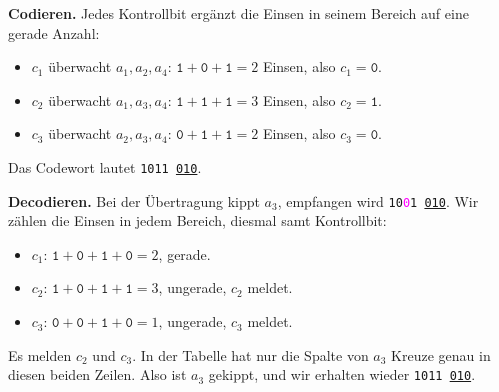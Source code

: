 \begin{myexample}
    \textbf{Codieren.} Jedes Kontrollbit ergänzt die Einsen in seinem
    Bereich auf eine gerade Anzahl:
    \begin{itemize}
        \item \textcolor{ueA}{\(c_1\)} überwacht \(a_1,a_2,a_4\):
              \(\texttt{1}+\texttt{0}+\texttt{1}=2\) Einsen, also \(c_1=\texttt{0}\).
        \item \textcolor{ueB}{\(c_2\)} überwacht \(a_1,a_3,a_4\):
              \(\texttt{1}+\texttt{1}+\texttt{1}=3\) Einsen, also \(c_2=\texttt{1}\).
        \item \textcolor{ueC}{\(c_3\)} überwacht \(a_2,a_3,a_4\):
              \(\texttt{0}+\texttt{1}+\texttt{1}=2\) Einsen, also \(c_3=\texttt{0}\).
    \end{itemize}
    Das Codewort lautet \texttt{1011\,\underline{010}}.

    \textbf{Decodieren.} Bei der Übertragung kippt \(a_3\), empfangen
    wird \texttt{10\textcolor{magenta}{0}1\,\underline{010}}. Wir zählen
    die Einsen in jedem Bereich, diesmal samt Kontrollbit:
    \begin{itemize}
        \item \textcolor{ueA}{\(c_1\)}: \(\texttt{1}+\texttt{0}+\texttt{1}+\texttt{0}=2\), gerade.
        \item \textcolor{ueB}{\(c_2\)}: \(\texttt{1}+\texttt{0}+\texttt{1}+\texttt{1}=3\), ungerade, \(c_2\) meldet.
        \item \textcolor{ueC}{\(c_3\)}: \(\texttt{0}+\texttt{0}+\texttt{1}+\texttt{0}=1\), ungerade, \(c_3\) meldet.
    \end{itemize}
    Es melden \(c_2\) und \(c_3\). In der Tabelle hat nur die Spalte
    von \(a_3\) Kreuze genau in diesen beiden Zeilen. Also ist \(a_3\)
    gekippt, und wir erhalten wieder \texttt{1011\,\underline{010}}.
\end{myexample}


